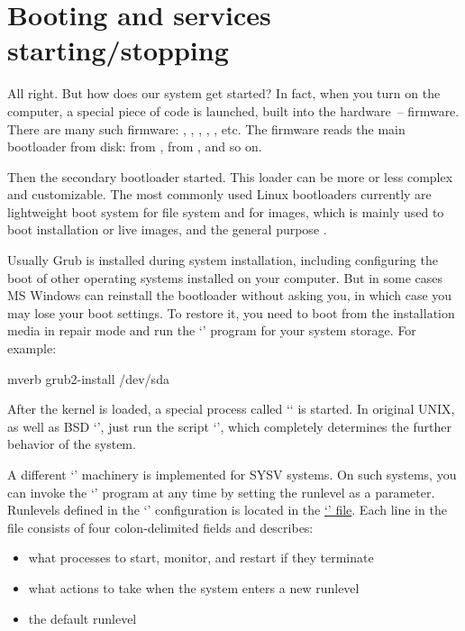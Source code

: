 \section*{Booting and services starting/stopping} %

All right. But how does our system get started? In fact, when you turn on
the computer, a special piece of code is launched, built into the hardware~--
firmware. There are many such firmware: , ,
, , , etc. The firmware reads
the main bootloader from disk:  from ,
 from , and so on.

Then the secondary bootloader started. This loader can be more or less complex
and customizable. The most commonly used Linux bootloaders currently are
lightweight boot system  for  file system and
 for  images, which is mainly used to boot
installation or live images, and the general purpose .

Usually Grub is installed during system installation, including configuring
the boot of other operating systems installed on your computer. But in some
cases MS Windows can reinstall the bootloader without asking you, in which case
you may lose your boot settings. To restore it, you need to boot from
the installation media in repair mode and run the `' program
for your system storage. For example:
\begin{code}{mverb}
grub2-install /dev/sda
\end{code}

After the kernel is loaded, a special process called `` is started.
In original UNIX, as well as BSD `', just run the script `',
which completely determines the further behavior of the system.

A different `' machinery is implemented for SYSV systems. On such
systems, you can invoke the `' program at any time by setting
the runlevel as a parameter. Runlevels defined in the `' configuration
is located in the \href{https://manpages.debian.org/unstable/sysvinit-core/inittab.5.en.html}%
{`' file}.
Each line in the  file consists of four colon-delimited fields and
describes:
\begin{itemize}
\item what processes to start, monitor, and restart if they terminate
\item what actions to take when the system enters a new runlevel
\item the default runlevel
\end{itemize}


